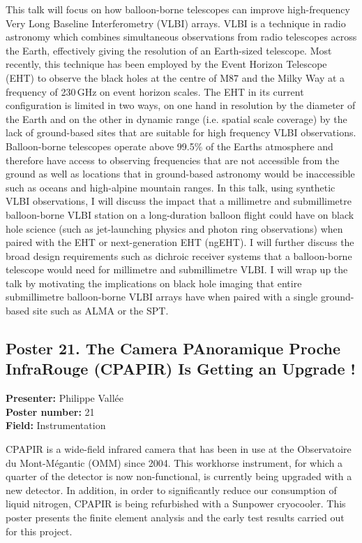 This talk will focus on how balloon-borne telescopes can improve high-frequency Very Long Baseline Interferometry (VLBI) arrays. VLBI is a technique in radio astronomy which combines simultaneous observations from radio telescopes across the Earth, effectively giving the resolution of an Earth-sized telescope. Most recently, this technique has been employed by the Event Horizon Telescope (EHT) to observe the black holes at the centre of M87 and the Milky Way at a frequency of 230\,GHz on event horizon scales. The EHT in its current configuration is limited in two ways, on one hand in resolution by the diameter of the Earth and on the other in dynamic range (i.e. spatial scale coverage) by the lack of ground-based sites that are suitable for high frequency VLBI observations. Balloon-borne telescopes operate above 99.5\% of the Earths atmosphere and therefore have access to observing frequencies that are not accessible from the ground as well as locations that in ground-based astronomy would be inaccessible such as oceans and high-alpine mountain ranges. In this talk, using synthetic VLBI observations, I will discuss the impact that a millimetre and submillimetre balloon-borne VLBI station on a long-duration balloon flight could have on black hole science (such as jet-launching physics and photon ring observations) when paired with the EHT or next-generation EHT (ngEHT). I will further discuss the broad design requirements such as dichroic receiver systems that a balloon-borne telescope would need for millimetre and submillimetre VLBI. I will wrap up the talk by motivating the implications on black hole imaging that entire submillimetre balloon-borne VLBI arrays have when paired with a single ground-based site such as ALMA or the SPT.

\hypertarget{poster-abstract-talk-170}{}\label{poster-abstract-page-talk-170}
\subsection*{Poster 21. The Camera PAnoramique Proche InfraRouge (CPAPIR) Is Getting an Upgrade !}
\textbf{Presenter:} Philippe Vallée\\
\textbf{Poster number:} 21\\
\textbf{Field:} Instrumentation

CPAPIR is a wide-field infrared camera that has been in use at the Observatoire du Mont-Mégantic (OMM) since 2004. This workhorse instrument, for which a quarter of the detector is now non-functional, is currently being upgraded with a new detector. In addition, in order to significantly reduce our consumption of liquid nitrogen, CPAPIR is being refurbished with a Sunpower cryocooler. This poster presents the finite element analysis and the early test results carried out for this project.

